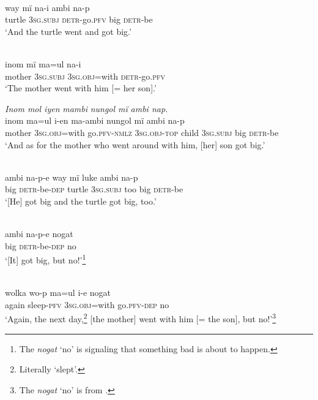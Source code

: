 \\
\gll way  mï       na-i ambi na-p\\
turtle  3\textsc{sg.subj}  \textsc{detr-}go.\textsc{pfv}  big    \textsc{detr}{}-be\\
\glt ‘And the turtle went and got big.’

\\
\gll inom  mï       ma=ul      na-i\\
mother  3\textsc{sg.subj}  \textsc{3sg.obj=}with  \textsc{detr}{}-go.\textsc{pfv}\\
\glt ‘The mother went with him [= her son].’

\ex \textit{Inom mol iyen} {\textit{mambi}} \textit{nungol m}{\textit{ï}} \textit{ambi nap.}\\
\gll inom  m{a=u}l      i-e{n} {ma-ambi} nungol  m{ï} ambi na{{}-}p\\
mother  3\textsc{sg.obj}=with  go.\textsc{pfv-nmlz}  3\textsc{sg.obj-top}  child  \textsc{3sg.subj}  big \textsc{detr}{}-be\\
\glt ‘And as for the mother who went around with him, [her] son got big.’

\newpage

\\
\gll ambi  na{{}-}p{{}-}e      way  mï      luke  ambi  na-p\\
big    \textsc{detr}{}-be-\textsc{dep}  turtle  3\textsc{sg.subj}  too    big    \textsc{detr}{}-be\\
\glt ‘[He] got big and the turtle {got big, too.}’


\\
\gll ambi na-p-e      nogat\\
big    \textsc{detr}{}-be-\textsc{dep}  no\\
\glt ‘[It] got big, but no!’\footnote{The   \textit{nogat} ‘no’ is signaling that something bad is about to happen.}

\\
\gll wolka  wo-p    m{a=u}l      i-e        nogat\\
again  sleep-\textsc{pfv}  3\textsc{sg.obj}=with  go.\textsc{pfv-dep}  no\\
\glt ‘Again, the next day,\footnote{Literally ‘slept’.} [the mother] went with him [= the son], but no!’\footnote{The  \textit{nogat} ‘no’ is from .}

